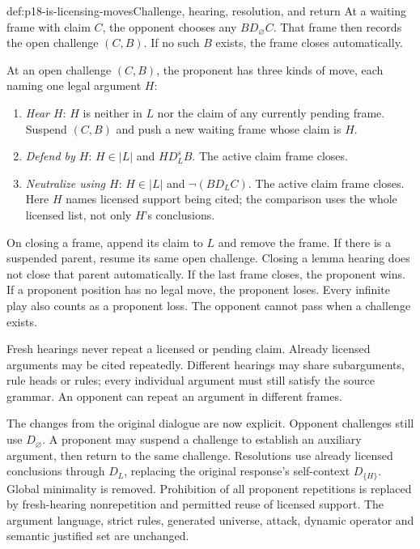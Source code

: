 \begin{hbdefinition}{def:p18-is-licensing-moves}{Challenge, hearing, resolution, and return}
At a waiting frame with claim \(C\), the opponent chooses any
\(B D_\varnothing C\). That frame then records the open challenge
\((C,B)\). If no such \(B\) exists, the frame closes automatically.

At an open challenge \((C,B)\), the proponent has three kinds of
move, each naming one legal argument \(H\):
\begin{enumerate}
\item \emph{Hear \(H\)}: \(H\) is neither in \(L\) nor the claim
of any currently pending frame. Suspend \((C,B)\) and push a new
waiting frame whose claim is \(H\).
\item \emph{Defend by \(H\)}: \(H\in |L|\) and \(H D_L^s B\).
The active claim frame closes.
\item \emph{Neutralize using \(H\)}: \(H\in |L|\) and
\(\neg(B D_L C)\). The active claim frame closes.
Here \(H\) names licensed support being cited; the comparison
uses the whole licensed list, not only \(H\)'s conclusions.
\end{enumerate}
On closing a frame, append its claim to \(L\) and remove the frame.
If there is a suspended parent, resume its same open challenge.
Closing a lemma hearing does not close that parent automatically.
If the last frame closes, the proponent wins.
If a proponent position has no legal move, the proponent loses.
Every infinite play also counts as a proponent loss.
The opponent cannot pass when a challenge exists.

Fresh hearings never repeat a licensed or pending claim.
Already licensed arguments may be cited repeatedly.
Different hearings may share subarguments, rule heads or rules;
every individual argument must still satisfy the source grammar.
An opponent can repeat an argument in different frames.
\end{hbdefinition}

The changes from the original dialogue are now explicit. Opponent
challenges still use \(D_\varnothing\). A proponent may suspend a
challenge to establish an auxiliary argument, then return to the
same challenge. Resolutions use already licensed conclusions through
\(D_L\), replacing the original response's self-context
\(D_{\{H\}}\). Global minimality is removed. Prohibition of all
proponent repetitions is replaced by fresh-hearing nonrepetition
and permitted reuse of licensed support.
The argument language, strict rules, generated universe, attack,
dynamic operator and semantic justified set are unchanged.


